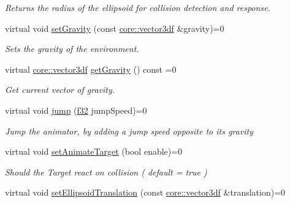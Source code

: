 \begin{DoxyCompactItemize}
\begin{DoxyCompactList}\small\item\em Returns the radius of the ellipsoid for collision detection and response. \end{DoxyCompactList}\item 
virtual void \hyperlink{classirr_1_1scene_1_1ISceneNodeAnimatorCollisionResponse_af366695a82153c144b58c65cb4d092f3}{set\+Gravity} (const \hyperlink{namespaceirr_1_1core_ae6e2b2a6c552833ebbd5b7463d03586b}{core\+::vector3df} \&gravity)=0
\begin{DoxyCompactList}\small\item\em Sets the gravity of the environment. \end{DoxyCompactList}\item 
virtual \hyperlink{namespaceirr_1_1core_ae6e2b2a6c552833ebbd5b7463d03586b}{core\+::vector3df} \hyperlink{classirr_1_1scene_1_1ISceneNodeAnimatorCollisionResponse_a1b7c86e8948691ce00f2aa6253c5683a}{get\+Gravity} () const =0
\begin{DoxyCompactList}\small\item\em Get current vector of gravity. \end{DoxyCompactList}\item 
virtual void \hyperlink{classirr_1_1scene_1_1ISceneNodeAnimatorCollisionResponse_a409b98d04be89fb06cce3384e0188abf}{jump} (\hyperlink{namespaceirr_a0277be98d67dc26ff93b1a6a1d086b07}{f32} jump\+Speed)=0
\begin{DoxyCompactList}\small\item\em \textquotesingle{}Jump\textquotesingle{} the animator, by adding a jump speed opposite to its gravity \end{DoxyCompactList}\item 
\mbox{\label{classirr_1_1scene_1_1ISceneNodeAnimatorCollisionResponse_a402cbe4934ad10f18762001458c939d9}} 
virtual void \hyperlink{classirr_1_1scene_1_1ISceneNodeAnimatorCollisionResponse_a402cbe4934ad10f18762001458c939d9}{set\+Animate\+Target} (bool enable)=0
\begin{DoxyCompactList}\small\item\em Should the Target react on collision ( default = true ) \end{DoxyCompactList}\item 
virtual void \hyperlink{classirr_1_1scene_1_1ISceneNodeAnimatorCollisionResponse_a234ec747d320d70dd3e2a4143782ffc7}{set\+Ellipsoid\+Translation} (const \hyperlink{namespaceirr_1_1core_ae6e2b2a6c552833ebbd5b7463d03586b}{core\+::vector3df} \&translation)=0

\end{DoxyCompactItemize}
